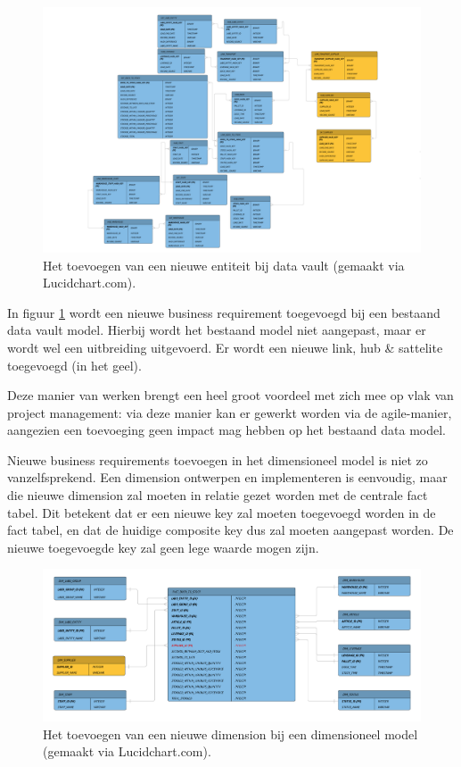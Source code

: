 \begin{figure}[h]
	\centering
	\includegraphics[scale=0.35]{../images/changedv.png}
	\caption{Het toevoegen van een nieuwe entiteit bij data vault (gemaakt via Lucidchart.com).}
	\label{fig:changedv}
\end{figure}

In figuur \ref{fig:changedv} wordt een nieuwe business requirement toegevoegd bij een bestaand data vault model. Hierbij wordt het bestaand model niet aangepast, maar er wordt wel een uitbreiding uitgevoerd. Er wordt een nieuwe link, hub \& sattelite toegevoegd (in het geel).

Deze manier van werken brengt een heel groot voordeel met zich mee op vlak van project management: via deze manier kan er gewerkt worden via de agile-manier, aangezien een toevoeging geen impact mag hebben op het bestaand data model.

Nieuwe business requirements toevoegen in het dimensioneel model is niet zo vanzelfsprekend. Een dimension ontwerpen en implementeren is eenvoudig, maar die nieuwe dimension zal moeten in relatie gezet worden met de centrale fact tabel. Dit betekent dat er een nieuwe key zal moeten toegevoegd worden in de fact tabel, en dat de huidige composite key dus zal moeten aangepast worden. De nieuwe toegevoegde key zal geen lege waarde mogen zijn.

\begin{figure}[h]
	\centering
	\includegraphics[scale=0.45]{../images/changedm.png}
	\caption{Het toevoegen van een nieuwe dimension bij een dimensioneel model (gemaakt via Lucidchart.com).}
	\label{fig:changedm}
\end{figure}

